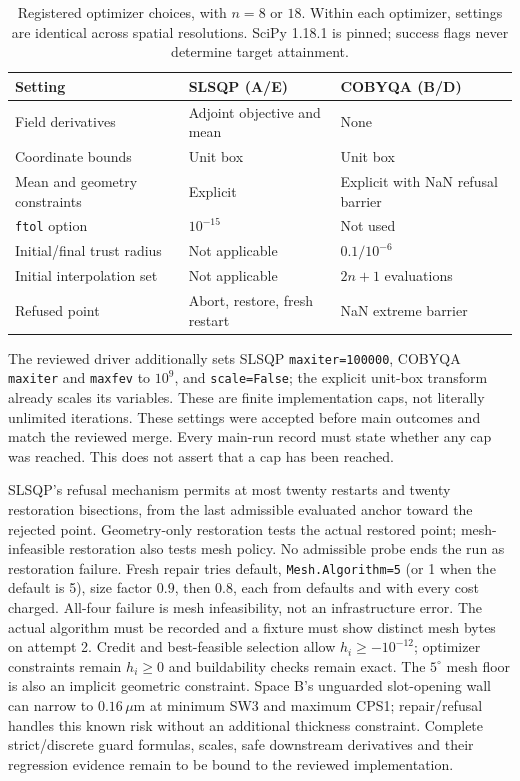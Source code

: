 \begin{table}[ht]
\centering\small
\begin{tabular}{lll}
\toprule
Setting & SLSQP (A/E) & COBYQA (B/D) \\
\midrule
Field derivatives & Adjoint objective and mean & None \\
Coordinate bounds & Unit box & Unit box \\
Mean and geometry constraints & Explicit & Explicit with NaN refusal barrier \\
\texttt{ftol} option & $10^{-15}$ & Not used \\
Initial/final trust radius & Not applicable & $0.1/10^{-6}$ \\
Initial interpolation set & Not applicable & $2n+1$ evaluations \\
Refused point & Abort, restore, fresh restart & NaN extreme barrier \\
\bottomrule
\end{tabular}
\caption{Registered optimizer choices, with $n=8$ or $18$. Within each
optimizer, settings are identical across spatial resolutions. SciPy 1.18.1
is pinned; success flags never determine target attainment.}
\label{tab:prospective-optimizer-settings}
\end{table}

The reviewed driver additionally sets SLSQP \texttt{maxiter=100000},
COBYQA \texttt{maxiter} and \texttt{maxfev} to $10^9$, and \texttt{scale=False}; the explicit
unit-box transform already scales its variables. These are finite
implementation caps, not literally unlimited iterations. These settings were
accepted before main outcomes and match the reviewed merge. Every main-run record must state whether
any cap was reached. This does not assert that a cap has been reached.

SLSQP's refusal mechanism permits at most twenty restarts and twenty
restoration bisections, from the last admissible evaluated anchor toward
the rejected point. Geometry-only restoration tests the actual restored
point; mesh-infeasible restoration also tests mesh policy. No admissible
probe ends the run as restoration failure. Fresh repair tries default,
\texttt{Mesh.Algorithm=5} (or 1 when the default is 5), size factor $0.9$,
then $0.8$, each from defaults
and with every cost charged. All-four failure is mesh infeasibility, not
an infrastructure error. The actual algorithm must be recorded and a fixture
must show distinct mesh bytes on attempt 2. Credit and best-feasible selection
allow $h_i\geq-10^{-12}$; optimizer constraints remain $h_i\geq0$ and
buildability checks remain exact. The $5^\circ$ mesh floor is also an implicit
geometric constraint. Space B's unguarded slot-opening wall can narrow to
$0.16\,\mu\mathrm{m}$ at minimum SW3 and maximum CPS1; repair/refusal handles
this known risk without an additional thickness constraint.
Complete strict/discrete guard formulas, scales,
safe downstream derivatives and their regression evidence remain to be
bound to the reviewed implementation.

